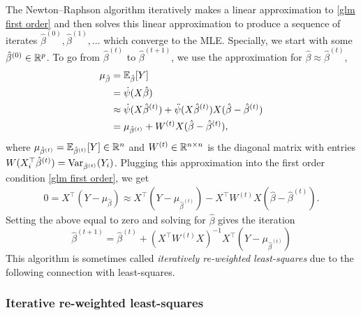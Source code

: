 The Newton--Raphson algorithm iteratively makes a linear approximation to \eqref{glm first order} and then solves this linear approximation to produce a sequence of iterates $\hat{\beta}^{(0)}, \hat{\beta}^{(1)},\ldots$ which converge to the MLE. Specially, we start with some $\hat{\beta}^{(0)} \in \mathbb{R}^p$. To go from $\hat{\beta}^{(t)}$ to $\hat{\beta}^{(t+1)}$, we use the approximation for $\hat{\beta} \approx \hat{\beta}^{(t)}$,
\begin{align*}
    \mu_{\hat{\beta}}&={\mathbb E}_{\hat{\beta}}[Y] \\
    &=\dot{\psi}(X\hat{\beta})\\
    &\approx \dot{\psi}(X\hat{\beta}^{(t)}) +  \ddot{\psi}(X\hat{\beta}^{(t)})X(\hat{\beta}-\hat{\beta}^{(t)}) \\
    &= \mu_{\hat{\beta}^{(t)}} + W^{(t)}X(\hat{\beta}-\hat{\beta}^{(t)}),
\end{align*}
where $\mu_{\hat{\beta}^{(t)}} = {\mathbb E}_{\hat{\beta}^{(t)}}[Y] \in \mathbb{R}^n$  and $W^{(t)} \in \mathbb{R}^{n \times n}$ is the diagonal matrix with entries $W(X_i^\top \hat{\beta}^{(t)}) = \mathrm{Var}_{\hat{\beta}^{(t)}}(Y_i)$. Plugging this approximation into the first order condition \eqref{glm first order}, we get
\begin{align*}
    0=X^\top(Y-\mu_{\hat{\beta}})\approx X^\top(Y - \mu_{\hat{\beta}^{(t)}}) - X^\top W^{(t)}X(\hat{\beta}-\hat{\beta}^{(t)}). 
\end{align*}
Setting the above equal to zero and solving for $\hat{\beta}$ gives the iteration
\begin{equation}\label{glm NR}
    \hat{\beta}^{(t+1)} = \hat{\beta}^{(t)} + (X^\top W^{(t)}X)^{-1}X^\top(Y-\mu_{\hat{\beta}^{(t)}})
\end{equation}
This algorithm is sometimes called \emph{iteratively re-weighted least-squares} due to the following connection with least-squares.

\subsubsection*{Iterative re-weighted least-squares}

